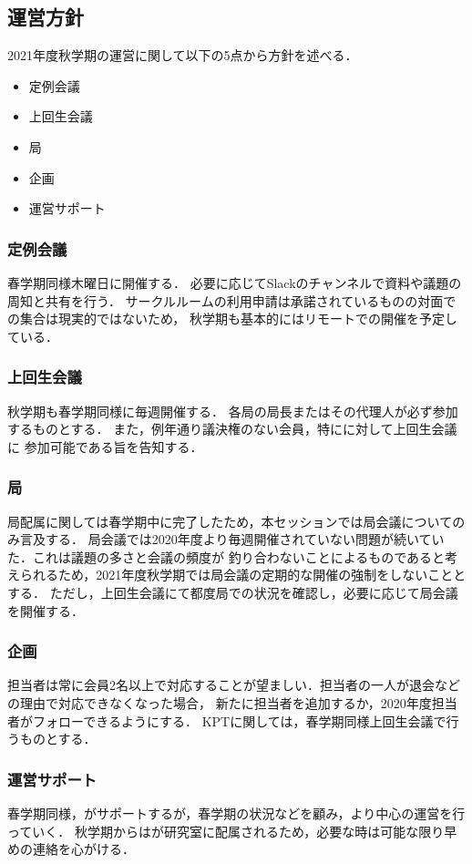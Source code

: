 \subsection*{運営方針}


2021年度秋学期の運営に関して以下の5点から方針を述べる．
\begin{itemize}
    \item 定例会議
    \item 上回生会議
    \item 局
    \item 企画
    \item 運営サポート
\end{itemize}

\subsubsection*{定例会議}
春学期同様木曜日に開催する．
必要に応じてSlackのチャンネルで資料や議題の周知と共有を行う．
サークルルームの利用申請は承諾されているものの対面での集合は現実的ではないため，
秋学期も基本的にはリモートでの開催を予定している．

\subsubsection*{上回生会議}
秋学期も春学期同様に毎週開催する．
各局の局長またはその代理人が必ず参加するものとする．
また，例年通り議決権のない会員，特に\firstGrade{}に対して上回生会議に
参加可能である旨を告知する．

\subsubsection*{局}
局配属に関しては春学期中に完了したため，本セッションでは局会議についてのみ言及する．
局会議では2020年度より毎週開催されていない問題が続いていた．これは議題の多さと会議の頻度が
釣り合わないことによるものであると考えられるため，2021年度秋学期では局会議の定期的な開催の強制をしないこととする．
ただし，上回生会議にて都度局での状況を確認し，必要に応じて局会議を開催する．

\subsubsection*{企画}
担当者は常に会員2名以上で対応することが望ましい．担当者の一人が退会などの理由で対応できなくなった場合，
新たに担当者を追加するか，2020年度担当者がフォローできるようにする．
KPTに関しては，春学期同様上回生会議で行うものとする．

\subsubsection*{運営サポート}
春学期同様，\thirdGrade{}がサポートするが，春学期の状況などを顧み，より\secondGrade{}中心の運営を行っていく．
秋学期からは\thirdGrade{}が研究室に配属されるため，必要な時は可能な限り早めの連絡を心がける．
